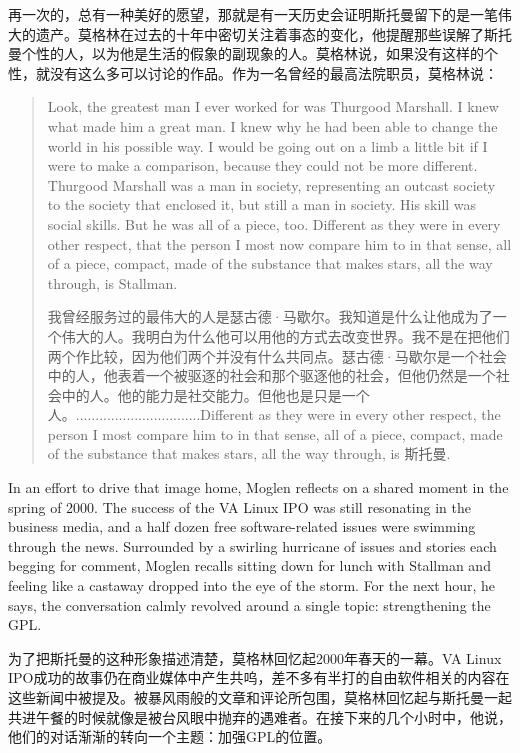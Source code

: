 \ifdefined\chs
再一次的，总有一种美好的愿望，那就是有一天历史会证明斯托曼留下的是一笔伟大的遗产。莫格林在过去的十年中密切关注着事态的变化，他提醒那些误解了斯托曼个性的人，以为他是生活的假象的副现象的人。莫格林说，如果没有这样的个性，就没有这么多可以讨论的作品。作为一名曾经的最高法院职员，莫格林说：
\fi

\begin{quote}
\ifdefined\eng
Look, the greatest man I ever worked for was Thurgood Marshall. I knew what made him a great man. I knew why he had been able to change the world in his possible way. I would be going out on a limb a little bit if I were to make a comparison, because they could not be more different. Thurgood Marshall was a man in society, representing an outcast society to the society that enclosed it, but still a man in society. His skill was social skills. But he was all of a piece, too. Different as they were in every other respect, that the person I most now compare him to in that sense, all of a piece, compact, made of the substance that makes stars, all the way through, is Stallman.
\fi

\ifdefined\chs
我曾经服务过的最伟大的人是瑟古德·马歇尔。我知道是什么让他成为了一个伟大的人。我明白为什么他可以用他的方式去改变世界。我不是在把他们两个作比较，因为他们两个并没有什么共同点。瑟古德·马歇尔是一个社会中的人，他表着一个被驱逐的社会和那个驱逐他的社会，但他仍然是一个社会中的人。他的能力是社交能力。但他也是只是一个人。................................Different as they were in every other respect, the person I most compare him to in that sense, all of a piece, compact, made of the substance that makes stars, all the way through, is 斯托曼.
\fi
\end{quote}

\ifdefined\eng
In an effort to drive that image home, Moglen reflects on a shared moment in the spring of 2000. The success of the VA Linux IPO was still resonating in the business media, and a half dozen free software-related issues were swimming through the news. Surrounded by a swirling hurricane of issues and stories each begging for comment, Moglen recalls sitting down for lunch with Stallman and feeling like a castaway dropped into the eye of the storm. For the next hour, he says, the conversation calmly revolved around a single topic: strengthening the GPL.
\fi

\ifdefined\chs
为了把斯托曼的这种形象描述清楚，莫格林回忆起2000年春天的一幕。VA Linux IPO成功的故事仍在商业媒体中产生共呜，差不多有半打的自由软件相关的内容在这些新闻中被提及。被暴风雨般的文章和评论所包围，莫格林回忆起与斯托曼一起共进午餐的时候就像是被台风眼中抛弃的遇难者。在接下来的几个小时中，他说，他们的对话渐渐的转向一个主题：加强GPL的位置。
\fi

